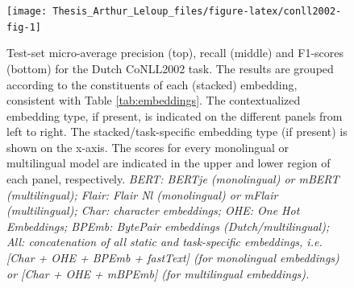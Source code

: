 \documentclass[12pt,a4paper,]{book}
\begin{document}
\begin{figure}

{\centering \texttt{[image: Thesis\_Arthur\_Leloup\_files/figure-latex/conll2002-fig-1]} 

}

\caption{Test-set micro-average precision (top), recall (middle) and F1-scores (bottom) for the Dutch CoNLL2002 task. The results are grouped according to the constituents of each (stacked) embedding, consistent with Table \ref{tab:embeddings}. The contextualized embedding type, if present, is indicated on the different panels from left to right. The stacked/task-specific embedding type (if present) is shown on the x-axis. The scores for every monolingual or multilingual model are indicated in the upper and lower region of each panel, respectively. \emph{BERT: BERTje (monolingual) or mBERT (multilingual); Flair: Flair Nl (monolingual) or mFlair (multilingual); Char: character embeddings; OHE: One Hot Embeddings; BPEmb: BytePair embeddings (Dutch/multilingual); All: concatenation of all static and task-specific embeddings, i.e. {[}Char + OHE + BPEmb + fastText{]} (for monolingual embeddings) or {[}Char + OHE + mBPEmb{]} (for multilingual embeddings).}}\label{fig:conll2002-fig}
\end{figure}
\end{document}
